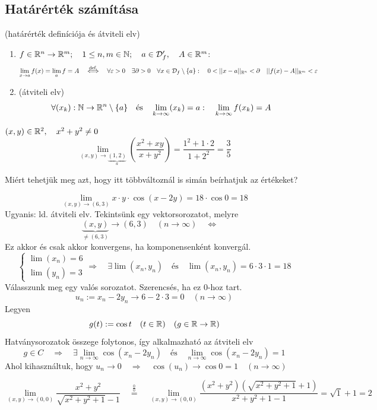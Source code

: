 \documentclass[a4paper,11.5pt]{article}
\begin{document}
	\subsection{Határérték számítása}
	\begin{revision} (határérték definíciója és átviteli elv)
		\begin{enumerate}
			\item $f\in\mathbb{R}^n\to\mathbb{R}^m;\quad 1\leq n,m\in\mathbb{N};\quad a\in\mathcal{D}_f',\quad A\in\mathbb{R}^m$:
			\[ \lim_{x\to a}f(x)=\lim_af=A\quad \overset{\text{def.}}{\Longleftrightarrow}\quad \forall\varepsilon>0\quad \exists\partial>0\quad \forall x\in\mathcal{D}_f\setminus\{a\}:\quad 0<||x-a||_{\R^n}<\partial\quad ||f(x)-A||_{\R^m}<\varepsilon \]
			\item (átviteli elv)\[ \forall (x_k):\mathbb{N}\to\mathbb{R}^n\setminus\{a\}\quad \text{és}\quad \lim_{k\to\infty}(x_k)=a:\quad \lim_{k\to\infty}f(x_k)=A \]
		\end{enumerate}
	\end{revision}
	\begin{task} $(x,y)\in\mathbb{R}^2,\quad x^2+y^2\not=0$
		\[ \lim_{(x,y)\to\underbrace{(1,2)}_{a}}\left(\frac{x^2+xy}{x+y^2}\right)=\frac{1^2+1\cdot2}{1+2^2}=\frac{3}{5} \]
	\end{task}
	Miért tehetjük meg azt, hogy itt többváltoznál is simán beírhatjuk az értékeket?
	\begin{task}
		\[ \lim_{(x,y)\to(6,3)}x\cdot y\cdot\cos(x-2y)=18\cdot\cos0=18 \]
		Ugyanis: ld. átviteli elv. Tekintsünk egy vektorsorozatot, melyre
		\[ \underbrace{(x,y)}_{\not=(6,3)}\to(6,3)\quad (n\to\infty)\quad \Leftrightarrow\quad  \]
		Ez akkor és csak akkor konvergens, ha komponensenként konvergál.
		\[\begin{cases}
			\lim(x_n)=6\\
			\lim(y_n)=3
		\end{cases} \Rightarrow\quad \exists\lim(x_n,y_n)\quad \text{és}\quad \lim(x_n,y_n)=6\cdot3\cdot1=18 \]
		Válasszunk meg egy valós sorozatot. Szerencsés, ha ez 0-hoz tart. %
		\[ u_n:=x_n-2y_n\to 6-2\cdot3=0\quad (n\to\infty) \]
		Legyen 
		\[ g(t):=\cos t\quad (t\in\mathbb{R})\quad (g\in\mathbb{R}\to\mathbb{R}) \]
		Hatványsorozatok összege folytonos, így alkalmazható az átviteli elv
		\[ g\in C\quad \Rightarrow\quad \exists\lim_{n\to\infty}\cos(x_n-2y_n)\quad \text{és}\quad \lim_{n\to\infty}\cos(x_n-2y_n)=1 \]
		Ahol kihasználtuk, hogy $u_n\to0\quad \Rightarrow\quad \cos(u_n)\to\cos 0=1\quad (n\to\infty)$
	\end{task}
	\begin{task}
		\[ \lim_{(x,y)\to(0,0)}\frac{x^2+y^2}{\sqrt{x^2+y^2+1}-1}\quad \overset{\frac{0}{0}}{=}\quad \lim_{(x,y)\to(0,0)}\frac{(x^2+y^2)(\sqrt{x^2+y^2+1}+1)}{x^2+y^2+1-1}=\sqrt{1}+1=2 \]
	\end{task}
\end{document}
